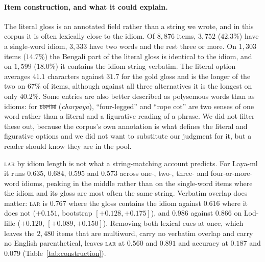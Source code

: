 \documentclass[11pt]{article}
\newcommand{\bangla}[1]{{\bn #1}}
\newcommand{\LAR}{\textsc{lar}}
\begin{document}
\paragraph{Item construction, and what it could explain.}
\label{app:items}
The literal gloss is an annotated field rather than a string we wrote, and in this
corpus it is often lexically close to the idiom. Of $8{,}876$ items, $3{,}752$
($42.3\%$) have a single-word idiom, $3{,}333$ have two words and the rest three
or more. On $1{,}303$ items ($14.7\%$) the Bengali part of the literal gloss is
identical to the idiom, and on $1{,}599$ ($18.0\%$) it contains the idiom string
verbatim. The literal option averages $41.1$ characters against $31.7$ for the
gold gloss and is the longer of the two on $67\%$ of items, although against all
three alternatives it is the longest on only $40.2\%$. Some entries are also
better described as polysemous words than as idioms: for \bangla{চারপায়া}
(\emph{charpaya}), ``four-legged'' and ``rope cot'' are two senses of one word
rather than a literal and a figurative reading of a phrase. We did not filter
these out, because the corpus's own annotation is what defines the literal and
figurative options and we did not want to substitute our judgment for it, but a
reader should know they are in the pool.

\LAR{} by idiom length is not what a string-matching account predicts. For
Laya-ml it runs $0.635$, $0.684$, $0.595$ and $0.573$ across one-, two-, three-
and four-or-more-word idioms, peaking in the middle rather than on the
single-word items where the idiom and its gloss are most often the same string.
Verbatim overlap does matter: \LAR{} is $0.767$ where the gloss contains the
idiom against $0.616$ where it does not ($+0.151$, bootstrap
$[+0.128, +0.175]$), and $0.986$ against $0.866$ on Lod-lille
($+0.120$, $[+0.089, +0.150]$). Removing both lexical cues at once, which leaves the
$2{,}480$ items that are multiword, carry no verbatim overlap and carry no
English parenthetical, leaves \LAR{} at $0.560$ and $0.891$ and accuracy at
$0.187$ and $0.079$ (Table~\ref{tab:construction}).
\end{document}
